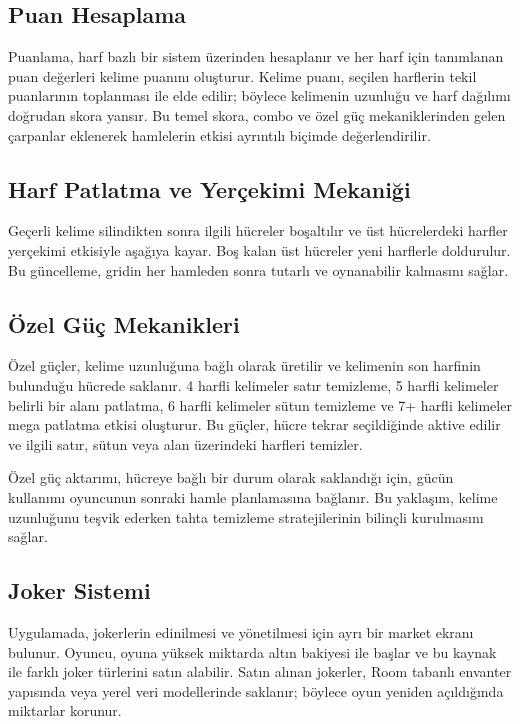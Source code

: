 \documentclass[conference]{IEEEtran}
\begin{document}
\subsection{Puan Hesaplama}

Puanlama, harf bazlı bir sistem üzerinden hesaplanır ve her
harf için tanımlanan puan değerleri kelime puanını oluşturur.
Kelime puanı, seçilen harflerin tekil puanlarının toplanması
ile elde edilir; böylece kelimenin uzunluğu ve harf dağılımı
doğrudan skora yansır. Bu temel skora, combo ve özel güç
mekaniklerinden gelen çarpanlar eklenerek hamlelerin etkisi
ayrıntılı biçimde değerlendirilir.

\subsection{Harf Patlatma ve Yerçekimi Mekaniği}

Geçerli kelime silindikten sonra ilgili hücreler boşaltılır ve
üst hücrelerdeki harfler yerçekimi etkisiyle aşağıya kayar.
Boş kalan üst hücreler yeni harflerle doldurulur. Bu güncelleme,
gridin her hamleden sonra tutarlı ve oynanabilir kalmasını sağlar.

\subsection{Özel Güç Mekanikleri}

Özel güçler, kelime uzunluğuna bağlı olarak üretilir ve
kelimenin son harfinin bulunduğu hücrede saklanır. 4 harfli
kelimeler satır temizleme, 5 harfli kelimeler belirli bir
alanı patlatma, 6 harfli kelimeler sütun temizleme ve 7+
harfli kelimeler mega patlatma etkisi oluşturur. Bu güçler,
hücre tekrar seçildiğinde aktive edilir ve ilgili satır,
sütun veya alan üzerindeki harfleri temizler.

Özel güç aktarımı, hücreye bağlı bir durum olarak saklandığı
için, gücün kullanımı oyuncunun sonraki hamle planlamasına
bağlanır. Bu yaklaşım, kelime uzunluğunu teşvik ederken
tahta temizleme stratejilerinin bilinçli kurulmasını sağlar.

\subsection{Joker Sistemi}

Uygulamada, jokerlerin edinilmesi ve yönetilmesi için
ayrı bir market ekranı bulunur. Oyuncu, oyuna yüksek
miktarda altın bakiyesi ile başlar ve bu kaynak ile
farklı joker türlerini satın alabilir. Satın alınan
jokerler, Room tabanlı envanter yapısında veya yerel
veri modellerinde saklanır; böylece oyun yeniden
açıldığında miktarlar korunur.
\end{document}
